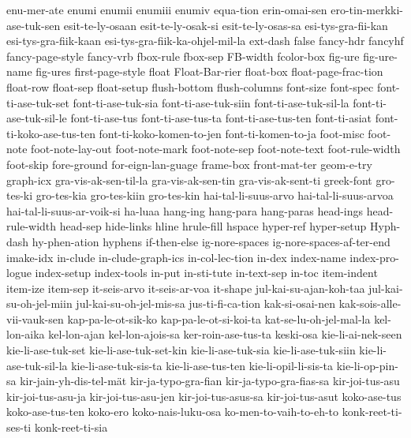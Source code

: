 {  enu-mer-ate
  enumi
  enumii
  enumiii
  enumiv
  equa-tion
  erin-omai-sen
  ero-tin-merkki-ase-tuk-sen
  esit-te-ly-osaan
  esit-te-ly-osak-si
  esit-te-ly-osas-sa
  esi-tys-gra-fii-kan
  esi-tys-gra-fiik-kaan
  esi-tys-gra-fiik-ka-ohjel-mil-la
  ext-dash
  false
  fancy-hdr
  fancyhf
  fancy-page-style
  fancy-vrb
  fbox-rule
  fbox-sep
  FB-width
  fcolor-box
  fig-ure
  fig-ure-name
  fig-ures
  first-page-style
  float
  Float-Bar-rier
  float-box
  float-page-frac-tion
  float-row
  float-sep
  float-setup
  flush-bottom
  flush-columns
  font-size
  font-spec
  font-ti-ase-tuk-set
  font-ti-ase-tuk-sia
  font-ti-ase-tuk-siin
  font-ti-ase-tuk-sil-la
  font-ti-ase-tuk-sil-le
  font-ti-ase-tus
  font-ti-ase-tus-ta
  font-ti-ase-tus-ten
  font-ti-asiat
  font-ti-koko-ase-tus-ten
  font-ti-koko-komen-to-jen
  font-ti-komen-to-ja
  foot-misc
  foot-note
  foot-note-lay-out
  foot-note-mark
  foot-note-sep
  foot-note-text
  foot-rule-width
  foot-skip
  fore-ground
  for-eign-lan-guage
  frame-box
  front-mat-ter
  geom-e-try
  graph-icx
  gra-vis-ak-sen-til-la
  gra-vis-ak-sen-tin
  gra-vis-ak-sent-ti
  greek-font
  gro-tes-ki
  gro-tes-kia
  gro-tes-kiin
  gro-tes-kin
  hai-tal-li-suus-arvo
  hai-tal-li-suus-arvoa
  hai-tal-li-suus-ar-voik-si
  ha-luaa
  hang-ing
  hang-para
  hang-paras
  head-ings
  head-rule-width
  head-sep
  hide-links
  hline
  hrule-fill
  hspace
  hyper-ref
  hyper-setup
  Hyph-dash
  hy-phen-ation
  hyphens
  if-then-else
  ig-nore-spaces
  ig-nore-spaces-af-ter-end
  imake-idx
  in-clude
  in-clude-graph-ics
  in-col-lec-tion
  in-dex
  index-name
  index-pro-logue
  index-setup
  index-tools
  in-put
  in-sti-tute
  in-text-sep
  in-toc
  item-indent
  item-ize
  item-sep
  it-seis-arvo
  it-seis-ar-voa
  it-shape
  jul-kai-su-ajan-koh-taa
  jul-kai-su-oh-jel-miin
  jul-kai-su-oh-jel-mis-sa
  jus-ti-fi-ca-tion
  kak-si-osai-nen
  kak-sois-alle-vii-vauk-sen
  kap-pa-le-ot-sik-ko
  kap-pa-le-ot-si-koi-ta
  kat-se-lu-oh-jel-mal-la
  kel-lon-aika
  kel-lon-ajan
  kel-lon-ajois-sa
  ker-roin-ase-tus-ta
  keski-osa
  kie-li-ai-nek-seen
  kie-li-ase-tuk-set
  kie-li-ase-tuk-set-kin
  kie-li-ase-tuk-sia
  kie-li-ase-tuk-siin
  kie-li-ase-tuk-sil-la
  kie-li-ase-tuk-sis-ta
  kie-li-ase-tus-ten
  kie-li-opil-li-sis-ta
  kie-li-op-pin-sa
  kir-jain-yh-dis-tel-mät
  kir-ja-typo-gra-fian
  kir-ja-typo-gra-fias-sa
  kir-joi-tus-asu
  kir-joi-tus-asu-ja
  kir-joi-tus-asu-jen
  kir-joi-tus-asus-sa
  kir-joi-tus-asut
  koko-ase-tus
  koko-ase-tus-ten
  koko-ero
  koko-nais-luku-osa
  ko-men-to-vaih-to-eh-to
  konk-reet-ti-ses-ti
  konk-reet-ti-sia
}
